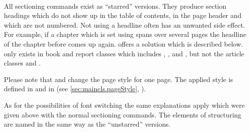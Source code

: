 \begin{Declaration}
  \\
  \\
  \\
  \\
  \\
  \\
\end{Declaration}%
%
%
%
%
%
%
%
All sectioning commands exist as ``starred'' versions. They produce
section headings which do not show up in the table of
contents, in the page header
and which are not numbered. Not using a headline
often has an unwanted side effect. For example, if a chapter which is
set using  spans over several pages the headline of
the chapter before comes up again. {\KOMAScript} offers a solution
which is described below.
 only exists in book and
report classes which includes , ,
 and , but not the article classes
 and .

Please note that  and  change the page
style for one page. The applied style is defined in
 and  in \KOMAScript{}
(see \autoref{sec:maincls.pageStyle},
).

As for the possibilities of font switching %
the same explanations apply which were given above with the normal
sectioning commands. The elements of structuring are named in the same
way as the ``unstarred'' versions.
%
%
%
%
%
%
%
%

\iffalse In the standard classes there are no further sectioning commands. In
particular, there are no commands which produce unnumbered chapters or
sections which show up in the table of contents or in the page header. \fi

